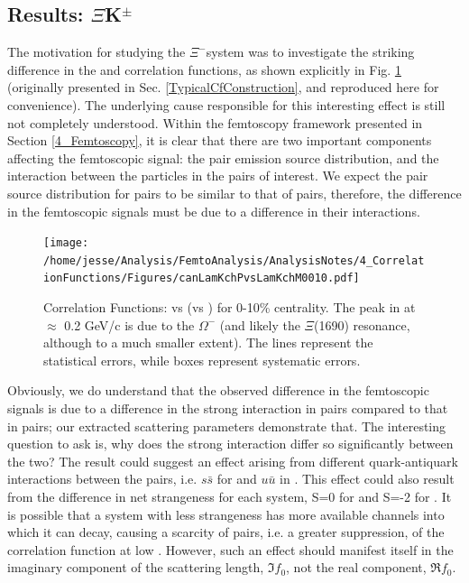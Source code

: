 \documentclass[/home/jesse/Analysis/FemtoAnalysis/AnalysisNotes/AnalysisNoteJBuxton.tex]{subfiles}
\begin{document}
\subsection{Results: \texorpdfstring{$\Xi$K$^{\pm}$}{TEXT}}
\label{ResultsXiK}

The motivation for studying the $\Xi^{-}$\Kpm system was to investigate the striking difference in the \LamKchP and \LamKchM correlation functions, as shown explicitly in Fig. \ref{fig:cLamcKchCfs0010_copy} (originally presented in Sec. \ref{TypicalCfConstruction}, and reproduced here for convenience).
The underlying cause responsible for this interesting effect is still not completely understood.
Within the femtoscopy framework presented in Section \ref{4_Femtoscopy}, it is clear that there are two important components affecting the femtoscopic signal: the pair emission source distribution, and the interaction between the particles in the pairs of interest.
We expect the pair source distribution for \LamKchP pairs to be similar to that of \LamKchM pairs, therefore, the difference in the femtoscopic signals must be due to a difference in their interactions.

\begin{figure}[h]
  \centering
  \texttt{[image: /home/jesse/Analysis/FemtoAnalysis/AnalysisNotes/4\_CorrelationFunctions/Figures/canLamKchPvsLamKchM0010.pdf]}
  \caption[Correlation functions: \LamKchP vs \LamKchM in 0-10\% centrality bin]{Correlation Functions: \LamKchP vs \LamKchM (\ALamKchP vs \ALamKchM) for 0-10\% centrality.  The peak in \LamKchMALamKchP at \kstar $\approx$ 0.2 GeV/c is due to the $\Omega^{-}$ (and likely the $\Xi$(1690) resonance, although to a much smaller extent).  The lines represent the statistical errors, while boxes represent systematic errors.}
  \label{fig:cLamcKchCfs0010_copy}
\end{figure}


Obviously, we do understand that the observed difference in the femtoscopic signals is due to a difference in the strong interaction in \LamKchP pairs compared to that in \LamKchM pairs; our extracted scattering parameters demonstrate that.
The interesting question to ask is, why does the strong interaction differ so significantly between the two?
The result could suggest an effect arising from different quark-antiquark interactions between the pairs, i.e. $s\bar{s}$ for \LamKchP and $u\bar{u}$ in \LamKchM.
This effect could also result from the difference in net strangeness for each system, S=0 for \LamKchP and S=-2 for \LamKchM.
It is possible that a system with less strangeness has more available channels into which it can decay, causing a scarcity of pairs, i.e. a greater suppression, of the correlation function at low \kstar.
However, such an effect should manifest itself in the imaginary component of the scattering length, $\Im f_{0}$, not the real component, $\Re f_{0}$.
\end{document}

